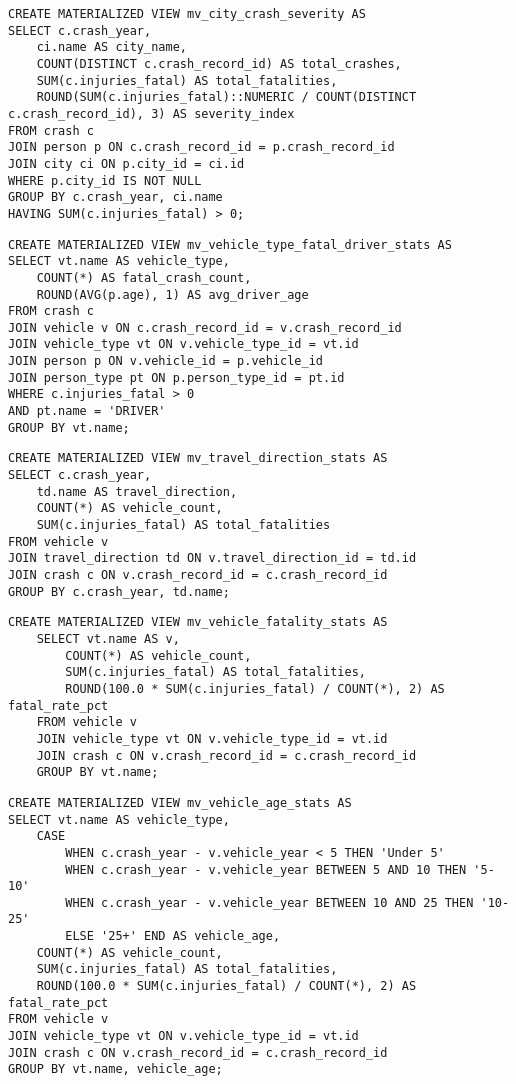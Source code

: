 \documentclass[12pt]{article}
\begin{document}
{\scriptsize
\begin{verbatim}
CREATE MATERIALIZED VIEW mv_city_crash_severity AS
SELECT c.crash_year,
    ci.name AS city_name,
    COUNT(DISTINCT c.crash_record_id) AS total_crashes,
    SUM(c.injuries_fatal) AS total_fatalities,
    ROUND(SUM(c.injuries_fatal)::NUMERIC / COUNT(DISTINCT c.crash_record_id), 3) AS severity_index
FROM crash c
JOIN person p ON c.crash_record_id = p.crash_record_id
JOIN city ci ON p.city_id = ci.id
WHERE p.city_id IS NOT NULL
GROUP BY c.crash_year, ci.name
HAVING SUM(c.injuries_fatal) > 0;
\end{verbatim}}

{\scriptsize
\begin{verbatim}
CREATE MATERIALIZED VIEW mv_vehicle_type_fatal_driver_stats AS
SELECT vt.name AS vehicle_type,
    COUNT(*) AS fatal_crash_count,
    ROUND(AVG(p.age), 1) AS avg_driver_age
FROM crash c
JOIN vehicle v ON c.crash_record_id = v.crash_record_id
JOIN vehicle_type vt ON v.vehicle_type_id = vt.id
JOIN person p ON v.vehicle_id = p.vehicle_id
JOIN person_type pt ON p.person_type_id = pt.id
WHERE c.injuries_fatal > 0 
AND pt.name = 'DRIVER'
GROUP BY vt.name;
\end{verbatim}}

{\scriptsize
\begin{verbatim}
CREATE MATERIALIZED VIEW mv_travel_direction_stats AS
SELECT c.crash_year,
    td.name AS travel_direction,
    COUNT(*) AS vehicle_count,
    SUM(c.injuries_fatal) AS total_fatalities
FROM vehicle v
JOIN travel_direction td ON v.travel_direction_id = td.id
JOIN crash c ON v.crash_record_id = c.crash_record_id
GROUP BY c.crash_year, td.name;
\end{verbatim}}

{\scriptsize
\begin{verbatim}
CREATE MATERIALIZED VIEW mv_vehicle_fatality_stats AS
    SELECT vt.name AS v,
        COUNT(*) AS vehicle_count,
        SUM(c.injuries_fatal) AS total_fatalities,
        ROUND(100.0 * SUM(c.injuries_fatal) / COUNT(*), 2) AS fatal_rate_pct
    FROM vehicle v
    JOIN vehicle_type vt ON v.vehicle_type_id = vt.id
    JOIN crash c ON v.crash_record_id = c.crash_record_id
    GROUP BY vt.name;
\end{verbatim}}

{\scriptsize
\begin{verbatim}
CREATE MATERIALIZED VIEW mv_vehicle_age_stats AS
SELECT vt.name AS vehicle_type,
    CASE
        WHEN c.crash_year - v.vehicle_year < 5 THEN 'Under 5'
        WHEN c.crash_year - v.vehicle_year BETWEEN 5 AND 10 THEN '5-10'
        WHEN c.crash_year - v.vehicle_year BETWEEN 10 AND 25 THEN '10-25'
        ELSE '25+' END AS vehicle_age,
    COUNT(*) AS vehicle_count,
    SUM(c.injuries_fatal) AS total_fatalities,
    ROUND(100.0 * SUM(c.injuries_fatal) / COUNT(*), 2) AS fatal_rate_pct
FROM vehicle v
JOIN vehicle_type vt ON v.vehicle_type_id = vt.id
JOIN crash c ON v.crash_record_id = c.crash_record_id
GROUP BY vt.name, vehicle_age;
\end{verbatim}}
\end{document}
